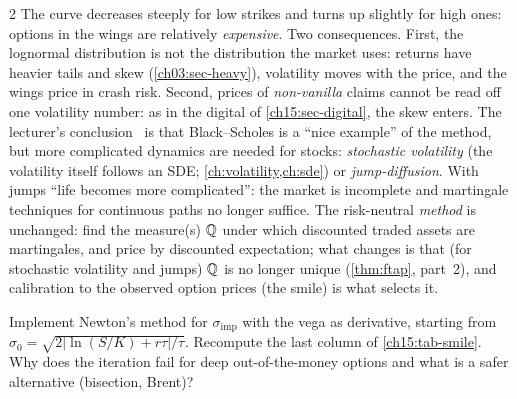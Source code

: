\begin{paracol}{2}
The curve decreases steeply for low strikes and turns up slightly for high ones: options in the wings are relatively \emph{expensive}. Two consequences. First, the lognormal distribution is not the distribution the market uses: returns have
heavier tails and skew (\cref{ch03:sec-heavy}), volatility moves with the price, and the wings price in crash risk. Second, prices of \emph{non-vanilla} claims cannot be read off one volatility number: as in the digital
of \cref{ch15:sec-digital}, the skew enters. The lecturer's conclusion \ is that Black--Scholes is a ``nice example'' of the method, but more complicated dynamics are needed for stocks: \emph{stochastic volatility}
(the volatility itself follows an SDE; \cref{ch:volatility,ch:sde}) or \emph{jump-diffusion}. With jumps ``life becomes more complicated'': the market is incomplete and martingale
techniques for continuous paths no longer suffice. The risk-neutral \emph{method} is unchanged: find the measure(s) $\mathbb{Q}$ under which discounted traded assets are martingales, and price by discounted expectation; what changes is that (for stochastic volatility and jumps) $\mathbb{Q}$
is no longer unique (\cref{thm:ftap}, part~2), and calibration to the observed option prices (the smile) is what selects it.

\begin{exercise}\label{ch15:ex-iv}
Implement Newton's method for $\sigma_{\mathrm{imp}}$ with the vega as derivative, starting from $\sigma_0=\sqrt{2|\ln(S/K)+r\tau|/\tau}$. Recompute the last column of \cref{ch15:tab-smile}. Why does the iteration fail for deep out-of-the-money options and what is a safer alternative (bisection, Brent)?
\end{exercise}


\end{paracol}
